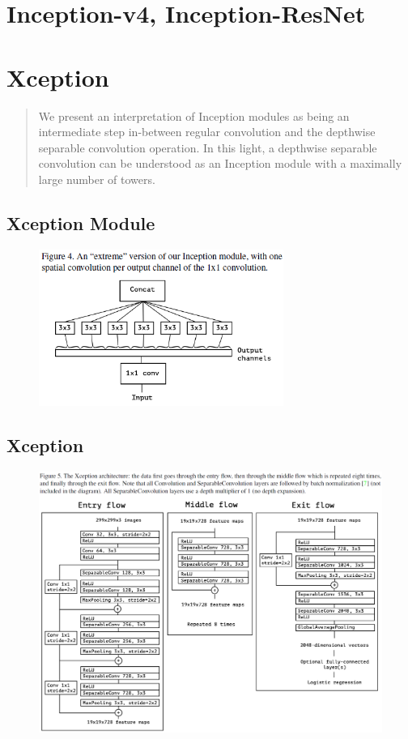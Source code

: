 \section{Inception-v4, Inception-ResNet}

\section{Xception}
\begin{quotation}
    We present an interpretation of Inception modules 
as being an intermediate step in-between regular convolution
and the depthwise separable convolution operation. In this
light, a depthwise separable convolution can be understood
as an Inception module with a maximally large number of towers.
\end{quotation}

\subsection{Xception Module}
\begin{figure}[H]
    \centering
    \includegraphics[width=8cm]{images/models/xception_m.png}
    \label{fig:xception_m}
\end{figure}

\subsection{Xception}
\begin{figure}[H]
    \centering
    \includegraphics[width=16cm]{images/models/xception.png}
    \label{fig:xception}
\end{figure}

